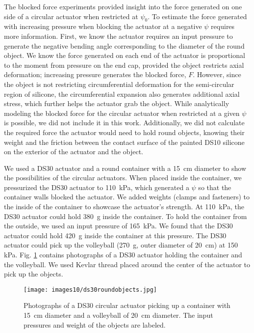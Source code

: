 The blocked force experiments provided insight into the force generated on one side of a circular actuator when restricted at $\psi_0$. To estimate the force generated with increasing pressure when blocking the actuator at a negative $\psi$ requires more information. First, we know the actuator requires an input pressure to generate the negative bending angle corresponding to the diameter of the round object. We know the force generated on each end of the actuator is proportional to the moment from pressure on the end cap, provided the object restricts axial deformation; increasing pressure generates the blocked force, $F$. However, since the object is not restricting circumferential deformation for the semi-circular region of silicone, the circumferential expansion also generates additional axial stress, which further helps the actuator grab the object. While analytically modeling the blocked force for the circular actuator when restricted at a given $\psi$ is possible, we did not include it in this work. Additionally, we did not calculate the required force the actuator would need to hold round objects, knowing their weight and the friction between the contact surface of the painted DS10 silicone on the exterior of the actuator and the object. 

We used a DS30 actuator and a round container with a 15~cm diameter to show the possibilities of the circular actuators. When placed inside the container, we pressurized the DS30 actuator to 110~kPa, which generated a $\psi$ so that the container walls blocked the actuator. We added weights (clamps and fasteners) to the inside of the container to showcase the actuator's strength. At 110~kPa, the DS30 actuator could hold 380~g inside the container. To hold the container from the outside, we used an input pressure of 165~kPa. We found that the DS30 actuator could hold 420~g inside the container at this pressure. The DS30 actuator could pick up the volleyball (270~g, outer diameter of 20~cm) at 150 kPa. Fig. \ref{fig:ds30roundobjects} contains photographs of a DS30 actuator holding the container and the volleyball. We used Kevlar thread placed around the center of the actuator to pick up the objects. 

\begin{figure}[!ht]
    \centering
     \texttt{[image: images10/ds30roundobjects.jpg]}
    \caption{Photographs of a DS30 circular actuator picking up a container with 15~cm diameter and a volleyball of 20~cm diameter. The input pressures and weight of the objects are labeled.}
    \label{fig:ds30roundobjects}
\end{figure}

